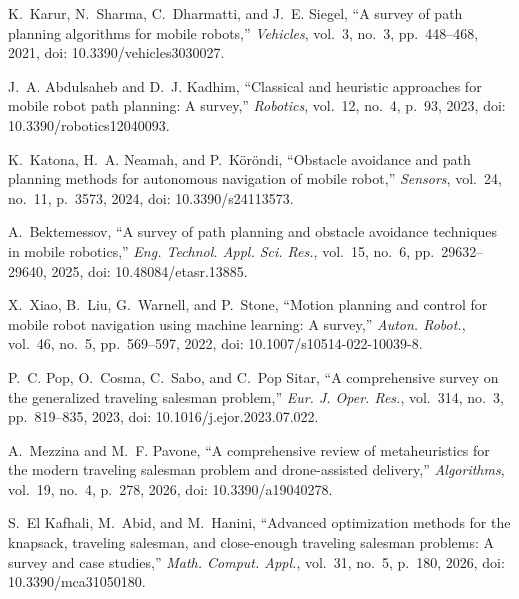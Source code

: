 

K.~Karur, N.~Sharma, C.~Dharmatti, and J.~E. Siegel,
``A survey of path planning algorithms for mobile robots,''
\textit{Vehicles}, vol.~3, no.~3, pp.~448--468, 2021,
doi: 10.3390/vehicles3030027.

J.~A. Abdulsaheb and D.~J. Kadhim,
``Classical and heuristic approaches for mobile robot path planning: A survey,''
\textit{Robotics}, vol.~12, no.~4, p.~93, 2023,
doi: 10.3390/robotics12040093.

K.~Katona, H.~A. Neamah, and P.~K\"or\"ondi,
``Obstacle avoidance and path planning methods for autonomous navigation of mobile robot,''
\textit{Sensors}, vol.~24, no.~11, p.~3573, 2024,
doi: 10.3390/s24113573.

A.~Bektemessov,
``A survey of path planning and obstacle avoidance techniques in mobile robotics,''
\textit{Eng. Technol. Appl. Sci. Res.}, vol.~15, no.~6, pp.~29632--29640, 2025,
doi: 10.48084/etasr.13885.

X.~Xiao, B.~Liu, G.~Warnell, and P.~Stone,
``Motion planning and control for mobile robot navigation using machine learning: A survey,''
\textit{Auton. Robot.}, vol.~46, no.~5, pp.~569--597, 2022,
doi: 10.1007/s10514-022-10039-8.

P.~C. Pop, O.~Cosma, C.~Sabo, and C.~Pop Sitar,
``A comprehensive survey on the generalized traveling salesman problem,''
\textit{Eur. J. Oper. Res.}, vol.~314, no.~3, pp.~819--835, 2023,
doi: 10.1016/j.ejor.2023.07.022.

A.~Mezzina and M.~F. Pavone,
``A comprehensive review of metaheuristics for the modern traveling salesman problem and drone-assisted delivery,''
\textit{Algorithms}, vol.~19, no.~4, p.~278, 2026,
doi: 10.3390/a19040278.

S.~El Kafhali, M.~Abid, and M.~Hanini,
``Advanced optimization methods for the knapsack, traveling salesman, and close-enough traveling salesman problems: A survey and case studies,''
\textit{Math. Comput. Appl.}, vol.~31, no.~5, p.~180, 2026,
doi: 10.3390/mca31050180.


